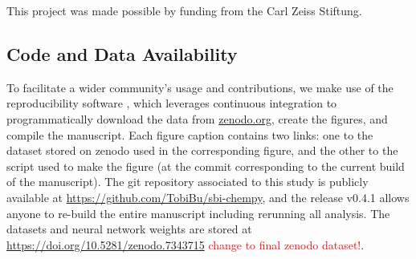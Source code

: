 \documentclass{aa}
\begin{document}
\begin{acknowledgements}
      This project was made possible by funding from the Carl Zeiss Stiftung.
\end{acknowledgements}

%
%





\begin{appendix}

\section{Code and Data Availability}
\label{sec:appendix_code_and_data}

To facilitate a wider community's usage and contributions, we make use of the reproducibility software
\href{https://github.com/showyourwork/showyourwork}{\showyourwork}
\citep{Luger2021}, which leverages continuous integration to
programmatically download the data from
\href{https://zenodo.org/}{zenodo.org}, create the figures, and
compile the manuscript. Each figure caption contains two links: one
to the dataset stored on zenodo used in the corresponding figure,
and the other to the script used to make the figure (at the commit
corresponding to the current build of the manuscript). The git
repository associated to this study is publicly available at
\url{https://github.com/TobiBu/sbi-chempy}, and the release
v0.4.1 allows anyone to re-build the entire manuscript including rerunning all analysis. The datasets and neural network weights are stored at \url{https://doi.org/10.5281/zenodo.7343715} \textcolor{red}{change to final zenodo dataset!}.



\end{appendix}
\end{document}
